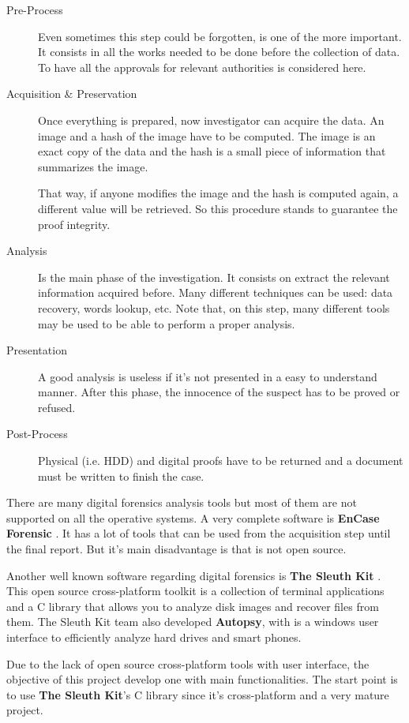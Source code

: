 \begin{description}
	\item [Pre-Process]
		Even sometimes this step could be forgotten, is one of the more
		important. It consists in all the works needed to be done before
		the collection of data. To have all the approvals for relevant
		authorities is considered here.

	\item [Acquisition \& Preservation]
		Once everything is prepared, now investigator can acquire the
		data. An image and a hash of the image have to be computed. The
		image is an exact copy of the data and the hash is a small piece
		of information that summarizes the image.

		That way, if anyone modifies the image and the hash is computed
		again, a different value will be retrieved. So this procedure
		stands to guarantee the proof integrity.

	\item [Analysis]
		Is the main phase of the investigation. It consists on extract
		the relevant information acquired before. Many different 
		techniques can be used: data recovery, words lookup, etc. Note
		that, on this step, many different tools may be used to be able
		to perform a proper analysis.

	\item [Presentation]
		A good analysis is useless if it's not presented in a easy to 
		understand manner. After this phase, the innocence of the
		suspect has to be proved or refused.

	\item [Post-Process]
		Physical (i.e. HDD) and digital proofs have to be returned and
		a document must be written to finish the case.
\end{description}

There are many digital forensics analysis tools but most of them are not
supported on all the operative systems. A very complete software is 
\textbf{EnCase Forensic} \cite{encase-web}. It has a lot of tools that can be 
used from the acquisition step until the final report. But it's main 
disadvantage is that is not open source.

Another well known software regarding digital forensics is \textbf{The Sleuth
Kit} \cite{tsk-web}. This open source cross-platform toolkit is a collection 
of terminal applications and a C library that allows you to analyze disk images 
and recover files from them. The Sleuth Kit team also developed
\textbf{Autopsy}, with is a windows user interface to efficiently analyze hard 
drives and smart phones.

Due to the lack of open source cross-platform tools with user interface, the
objective of this project develop one with main functionalities. The start point
is to use \textbf{The Sleuth Kit}'s C library since it's cross-platform and a 
very mature project.

